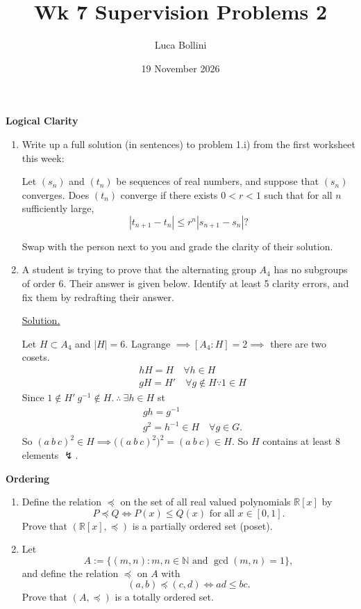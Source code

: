 \documentclass{article}
\title{Wk 7 Supervision Problems 2}
\author{Luca Bollini}
\date{19 November 2026}
\newcommand{\N}{\mathbb{N}}
\newcommand{\R}{\mathbb{R}}
\begin{document}
\maketitle

\begin{center}
\huge{\textbf{Logical Clarity}}
\end{center}

\begin{enumerate}
    \item Write up a full solution (in sentences) to problem 1.i) from the first worksheet this week:
    \begin{questionbox}
        Let $(s_n)$ and $(t_n)$ be sequences of real numbers, and suppose that $(s_n)$ converges. Does $(t_n)$ converge if there exists $0<r<1$ such that for all $n$ sufficiently large,
        \[
        |t_{n+1}-t_{n}| \leq r^n|s_{n+1}-s_n|\text{?}
        \]
    \end{questionbox}
    Swap with the person next to you and grade the clarity of their solution.

    \item A student is trying to prove that the alternating group $A_4$ has no subgroups of order 6. Their answer is given below. Identify at least 5 clarity errors, and fix them by redrafting their answer.

    \begin{itshape}
        \underline{Solution.}

        Let $H\subset A_4$ and $|H|=6$. Lagrange $\implies [A_4:H]=2 \implies$ there are two cosets.
        \[
        \begin{aligned}
            &hH=H\quad\forall h\in H\\
            &gH=H'\quad\forall g\notin H \because 1\in H
        \end{aligned}
        \]
        Since $1\notin H'\ g^{-1}\notin H.\ \therefore\ \exists h\in H$ st
        \[
        \begin{aligned}
            &gh= g^{-1}\\
            &g^2=h^{-1}\in H\quad \forall g\in G.
        \end{aligned}
        \]
        So $(a~b~c)^2\in H \implies \big((a~b~c)^2\big)^2=(a~b~c)\in H$. So $H$ contains at least $8$ elements $\lightning$.
    \end{itshape}
\end{enumerate}

\begin{center}
\huge{\textbf{Ordering}}
\end{center}

\begin{enumerate}
    \item Define the relation $\preceq$ on the set of all real valued polynomials $\R[x]$ by
    \[
    P\preceq Q \iff P(x)\leq Q(x) \text{ for all } x\in[0,1].
    \]
    Prove that $(\R[x],\preceq)$ is a partially ordered set (poset).
    \item Let
    \[
    A:= \{(m,n):m,n\in\N\text{ and }\gcd(m,n)=1\},
    \]
    and define the relation $\preceq$ on $A$ with
    \[
    (a,b)\preceq (c,d) \iff ad\leq bc.
    \]
    Prove that $(A,\preceq)$ is a totally ordered set.
\end{enumerate}
\end{document}
